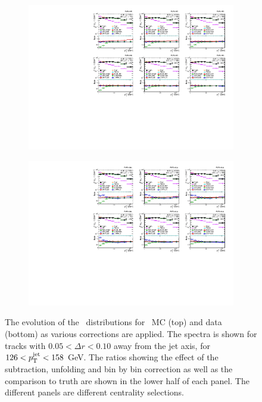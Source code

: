 \begin{figure}
\centering
\begin{subfigure}{0.9\textwidth}
\centering \includegraphics[page=5, width=1\textwidth]{figures/main/corrections/evol_PbPb_MC.pdf}
\caption{}
\end{subfigure}
\begin{subfigure}{0.9\textwidth}
\centering \includegraphics[page=5, width=1\textwidth]{figures/main/corrections/evol_PbPb_data.pdf}
\caption{}
\end{subfigure}
\caption{The evolution of the \Dptr\ distributions for \PbPb\ MC (top) and data (bottom) as various corrections are applied.
The spectra is shown for tracks with $0.05 < \Delta r < 0.10$ away from the jet axis, for $126 < \mbox{$p_{\mathrm{T}}^{\mathrm{jet}}$} < 158$ GeV.
The ratios showing the effect of the subtraction, unfolding and bin by bin correction as well as the comparison to truth are shown in the lower half of each panel.
The different panels are different centrality selections.}
\label{fig:evol_PbPb}
\end{figure}


